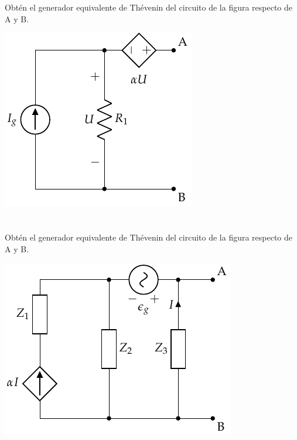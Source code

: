 \documentclass[12pt]{article}
\begin{document}
\noindent\hrulefill

\clearpage

\section{}

Obtén el generador equivalente de Thévenin del circuito de la figura respecto de A y B.
\begin{center}
\includegraphics{figs/Thevenin1}
\end{center}

\noindent\hrulefill

\clearpage

\section{}

Obtén el generador equivalente de Thévenin del circuito de la figura respecto de A y B.

\begin{center}
\includegraphics{figs/Thevenin4}
\end{center}
\end{document}
